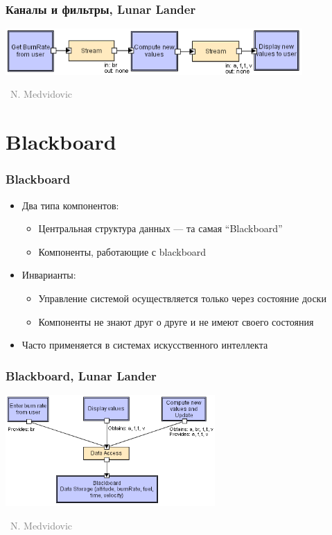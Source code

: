 \documentclass[xetex,mathserif,serif]{beamer}
\newcommand{\attribution}[1] {
	\vspace{-5mm}\begin{flushright}\begin{scriptsize}\textcolor{gray}{\textcopyright\, #1}\end{scriptsize}\end{flushright}
}
\begin{document}
	\begin{frame}
		\frametitle{Каналы и фильтры, Lunar Lander}
		\begin{center}
			\includegraphics[width=0.85\textwidth]{pipesAndFiltersLL.png}
			\attribution{N. Medvidovic}
		\end{center}
	\end{frame}

	\section{Blackboard}

	\begin{frame}
		\frametitle{Blackboard}
		\begin{itemize}
			\item Два типа компонентов:
			\begin{itemize}
				\item Центральная структура данных --- та самая ``Blackboard''
				\item Компоненты, работающие с blackboard
			\end{itemize}
			\item Инварианты:
			\begin{itemize}
				\item Управление системой осуществляется только через состояние доски
				\item Компоненты не знают друг о друге и не имеют своего состояния
			\end{itemize}
			\item Часто применяется в системах искусственного интеллекта
		\end{itemize}
	\end{frame}

	\begin{frame}
		\frametitle{Blackboard, Lunar Lander}
		\begin{center}
			\includegraphics[width=0.6\textwidth]{blackboardLL.png}
			\attribution{N. Medvidovic}
		\end{center}
	\end{frame}
\end{document}
